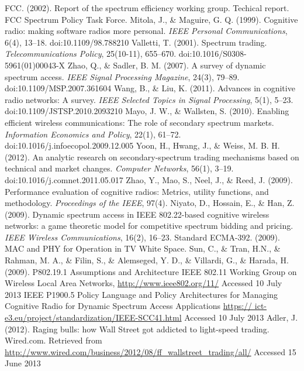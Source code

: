 \begin{thebibliography}{}
 FCC. (2002). Report of the spectrum efficiency working group. Techical report. FCC Spectrum Policy Task Force.
 Mitola, J., \& Maguire, G. Q. (1999). Cognitive radio: making software radios more personal.\textit{ IEEE Personal Communications}, 6(4), 13–18. doi:10.1109/98.788210
 Valletti, T. (2001). Spectrum trading. \textit{Telecommunications Policy}, 25(10-11), 655–670. doi:10.1016/S0308-5961(01)00043-X
 Zhao, Q., \& Sadler, B. M. (2007). A survey of dynamic spectrum access. \textit{IEEE Signal Processing Magazine}, 24(3), 79–89. doi:10.1109/MSP.2007.361604
 Wang, B., \& Liu, K. (2011). Advances in cognitive radio networks: A survey. \textit{IEEE Selected Topics in Signal Processing}, 5(1), 5–23. doi:10.1109/JSTSP.2010.2093210
 Mayo, J. W., \& Wallsten, S. (2010). Enabling efficient wireless communications: The role of secondary spectrum markets. \textit{Information Economics and Policy}, 22(1), 61–72. doi:10.1016/j.infoecopol.2009.12.005
 Yoon, H., Hwang, J., \& Weiss, M. B. H. (2012). An analytic research on secondary-spectrum trading mechanisms based on technical and market changes. \textit{Computer Networks}, 56(1), 3–19. doi:10.1016/j.comnet.2011.05.017
 Zhao, Y., Mao, S., Neel, J., \& Reed, J. (2009). Performance evaluation of cognitive radios: Metrics, utility functions, and methodology. \textit{Proceedings of the IEEE}, 97(4).
 Niyato, D., Hossain, E., \& Han, Z. (2009). Dynamic spectrum access in IEEE 802.22-based cognitive wireless networks: a game theoretic model for competitive spectrum bidding and pricing. \textit{IEEE Wireless Communications}, 16(2), 16–23.
 Standard ECMA-392. (2009). MAC and PHY for Operation in TV White Space.
 Sun, C., \& Tran, H.N., \& Rahman, M. A., \& Filin, S., \& Alemseged, Y. D., \& Villardi, G., \& Harada, H. (2009). P802.19.1 Assumptions and Architecture
 IEEE 802.11 Working Group on Wireless Local Area Networks, \url{http://www.ieee802.org/11/} Accessed 10 July 2013
 IEEE P1900.5 Policy Language and Policy Architectures for Managing Cognitive Radio for Dynamic Spectrum Access Applications \url{https:// ict-e3.eu/project/standardization/IEEE-SCC41.html} Accessed 10 July 2013
 Adler, J. (2012). Raging bulls: how Wall Street got addicted to light-speed trading. Wired.com. Retrieved from \url{http://www.wired.com/business/2012/08/ff_wallstreet_trading/all/} Accessed 15 June 2013


\end{thebibliography}
